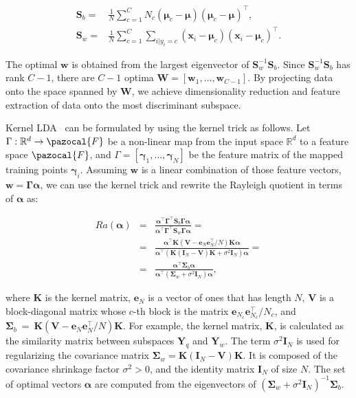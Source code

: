 \begin{align}
    \bm{S}_{b} = & \frac{1}{N} \sum_{c=1}^{C} N_{c}(\bm{\mu}_{c} - \bm{\mu})(\bm{\mu}_{c} - \bm{\mu})^{\top},                   \\
    \bm{S}_{w} = & \frac{1}{N} \sum_{c=1}^{C} \sum_{i|y_{i} = c} (\bm{x}_{i} - \bm{\mu}_{c})(\bm{x}_{i} - \bm{\mu}_{c})^{\top}.
\end{align}

The optimal $\bm{w}$ is obtained from the largest eigenvector
of $\bm{S}_{w}^{-1}\bm{S}_{b}$. Since $\bm{S}_{w}^{-1}\bm{S}_{b}$ has rank $C - 1$, there are $C - 1$ optima $\bm{W} = [ \bm{w}_{1}, \ldots, \bm{w}_{C-1} ]$.
By projecting data onto the space spanned by $\bm{W}$, we
achieve dimensionality reduction and feature extraction
of data onto the most discriminant subspace.

Kernel LDA~\cite{scholkopft1999fisher,baudat2000generalized,li2001constructing} can be formulated by using the kernel trick as follows. Let $\Gamma: \mathbb{R}^ {d} \rightarrow \pazocal{F}$ be a non-linear map from the input space $\mathbb{R}^ {d}$ to a feature space $\pazocal{F}$,
and $\Gamma = [\bm{\gamma}_{1},\ldots,\bm{\gamma}_{N}]$ be the feature matrix of the mapped training points $\bm{\gamma}_{i}$. Assuming $\bm{w}$ is a linear combination of those feature vectors, $\bm{w} = \bm{\Gamma}\bm{\alpha}$, we can use the kernel trick and rewrite the Rayleigh quotient in terms of $\bm{\alpha}$ as:

\begin{eqnarray}
    Ra(\bm{\alpha}) &=& \frac{\bm{\alpha}^{\top}\bm{\Gamma}^{\top}\bm{S}_{b}\bm{\Gamma} \bm{\alpha}}{\bm{\alpha}^{\top}\bm{\Gamma} ^{\top}\bm{S}_{w}\bm{\Gamma} \bm{\alpha}} = \nonumber\\
    &=& \frac{\bm{\alpha}^{\top}\bm{K}(\bm{V} - \bm{e}_{N}\bm{e}_{N}^{\top}/N)\bm{K}\bm{\alpha}}{\bm{\alpha}^{\top}(\bm{K}(\bm{I}_{N}-\bm{V})\bm{K}+ \sigma^{2}\bm{I}_{N})\bm{\alpha}} = \nonumber\\
    &=& \frac{\bm{\alpha}^{\top}\bm{\Sigma}_{b}\bm{\alpha}}{\bm{\alpha}^{\top}(\bm{\Sigma}_{w}+\sigma^{2}\bm{I}_{N})\bm{\alpha}},
\end{eqnarray}


\noindent where $\bm{K}$ is the kernel matrix, $\bm{e}_{N}$ is a vector
of ones that has length $N$, $\bm{V}$ is a block-diagonal matrix
whose $c$-th block is the matrix $\bm{e}_{N_{c}}\bm{e}_{N_{c}}^{\top}/ N_{c}$, and $\bm{\Sigma}_{b}~=~\bm{K}(\bm{V} - \bm{e}_{N}\bm{e}_{N}^{\top}/N)\bm{K}$.
For example, the kernel matrix, $\bm{K}$, is calculated as the similarity matrix between subspaces $\bm{Y}_{q}$ and $\bm{Y}_{w}$.
The term $\sigma^{2} \bm{I}_{N}$ is used for regularizing the covariance matrix $\bm{\Sigma}_{w} = \bm{K}(\bm{I}_{N}  -\bm{V})\bm{K}$. It is composed of the covariance shrinkage factor $\sigma^{2} > 0$, and the identity matrix $\bm{I}_{N}$ of size $N$. The set of optimal vectors $\bm{\alpha}$ are computed from the eigenvectors of $(\bm{\Sigma}_{w}+\sigma^{2}\bm{I}_{N})^{-1}\bm{\Sigma}_{b}$.

